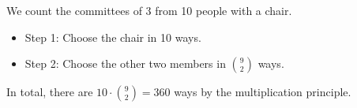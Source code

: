 We count the committees of 3 from 10 people with a chair.

\begin{itemize}
  \item Step 1: Choose the chair in 10 ways.
  \item Step 2: Choose the other two members in $\binom{9}{2}$ ways.
\end{itemize}

In total, there are $10 \cdot \binom{9}{2} = 360$ ways by the multiplication principle.